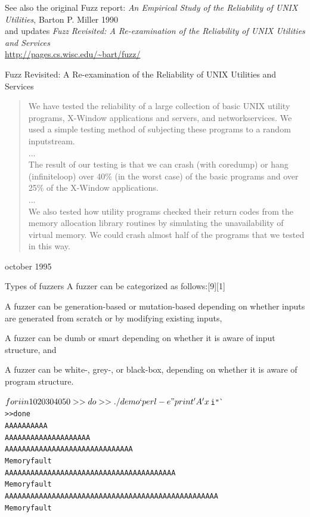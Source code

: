 \documentclass[Screen16to9,17pt]{foils}
\begin{document}
See also the original Fuzz report: \emph{An Empirical Study of the Reliability
of UNIX Utilities}, Barton P. Miller 1990\\
and updates \emph{Fuzz Revisited: A Re-examination of the Reliability
of UNIX Utilities and Services}\\
\url{http://pages.cs.wisc.edu/~bart/fuzz/}


Fuzz Revisited: A Re-examination of the Reliability
of
UNIX Utilities and Services

\begin{quote}
We have tested the reliability of a large collection of basic UNIX utility programs, X-Window
applications and servers, and networkservices. We used a simple testing method of subjecting these
programs to a random inputstream.\\
...\\
The result of our testing is that we can crash (with coredump) or hang (infiniteloop) over 40\% (in the
worst case) of the basic programs and over 25\% of the X-Window applications.\\
...\\
We also tested how utility programs checked their return codes from the memory allocation library
routines by simulating the unavailability of virtual memory. We could crash almost half of the programs
that we tested in this way.
\end{quote}

\centerline{october 1995}




Types of fuzzers
A fuzzer can be categorized as follows:[9][1]
\begin{list2}
\item A fuzzer can be generation-based or mutation-based depending on whether inputs are generated from scratch or by modifying existing inputs,
\item A fuzzer can be dumb or smart depending on whether it is aware of input structure, and
\item A fuzzer can be white-, grey-, or black-box, depending on whether it is aware of program structure.
\end{list2}



\begin{alltt}
$ for i in 10 20 30 40 50
>> do
>> ./demo `perl -e "print 'A'x$i"`
>> done
AAAAAAAAAA
AAAAAAAAAAAAAAAAAAAA
AAAAAAAAAAAAAAAAAAAAAAAAAAAAAA
Memory fault
AAAAAAAAAAAAAAAAAAAAAAAAAAAAAAAAAAAAAAAA
Memory fault
AAAAAAAAAAAAAAAAAAAAAAAAAAAAAAAAAAAAAAAAAAAAAAAAAA
Memory fault
\end{alltt}
\end{document}
